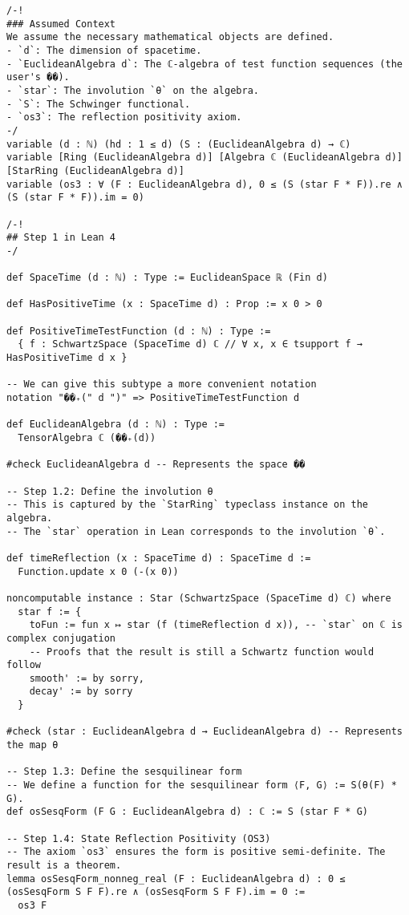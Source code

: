 \documentclass{article}
\newcommand{\1}{\mathbbm{1}}
\theoremstyle{plain}
\theoremstyle{definition}
\numberwithin{equation}{section}
\begin{document}
\begin{lstlisting}
/-!
### Assumed Context
We assume the necessary mathematical objects are defined.
- `d`: The dimension of spacetime.
- `EuclideanAlgebra d`: The ℂ-algebra of test function sequences (the user's ��).
- `star`: The involution `θ` on the algebra.
- `S`: The Schwinger functional.
- `os3`: The reflection positivity axiom.
-/
variable (d : ℕ) (hd : 1 ≤ d) (S : (EuclideanAlgebra d) → ℂ)
variable [Ring (EuclideanAlgebra d)] [Algebra ℂ (EuclideanAlgebra d)] [StarRing (EuclideanAlgebra d)]
variable (os3 : ∀ (F : EuclideanAlgebra d), 0 ≤ (S (star F * F)).re ∧ (S (star F * F)).im = 0)

/-!
## Step 1 in Lean 4
-/

def SpaceTime (d : ℕ) : Type := EuclideanSpace ℝ (Fin d)

def HasPositiveTime (x : SpaceTime d) : Prop := x 0 > 0

def PositiveTimeTestFunction (d : ℕ) : Type :=
  { f : SchwartzSpace (SpaceTime d) ℂ // ∀ x, x ∈ tsupport f → HasPositiveTime d x }

-- We can give this subtype a more convenient notation
notation "��₊(" d ")" => PositiveTimeTestFunction d

def EuclideanAlgebra (d : ℕ) : Type :=
  TensorAlgebra ℂ (��₊(d))

#check EuclideanAlgebra d -- Represents the space ��

-- Step 1.2: Define the involution θ
-- This is captured by the `StarRing` typeclass instance on the algebra.
-- The `star` operation in Lean corresponds to the involution `θ`.

def timeReflection (x : SpaceTime d) : SpaceTime d :=
  Function.update x 0 (-(x 0))

noncomputable instance : Star (SchwartzSpace (SpaceTime d) ℂ) where
  star f := {
    toFun := fun x ↦ star (f (timeReflection d x)), -- `star` on ℂ is complex conjugation
    -- Proofs that the result is still a Schwartz function would follow
    smooth' := by sorry,
    decay' := by sorry
  }
  
#check (star : EuclideanAlgebra d → EuclideanAlgebra d) -- Represents the map θ

-- Step 1.3: Define the sesquilinear form
-- We define a function for the sesquilinear form ⟨F, G⟩ := S(θ(F) * G).
def osSesqForm (F G : EuclideanAlgebra d) : ℂ := S (star F * G)

-- Step 1.4: State Reflection Positivity (OS3)
-- The axiom `os3` ensures the form is positive semi-definite. The result is a theorem.
lemma osSesqForm_nonneg_real (F : EuclideanAlgebra d) : 0 ≤ (osSesqForm S F F).re ∧ (osSesqForm S F F).im = 0 :=
  os3 F


\end{lstlisting}
\end{document}
